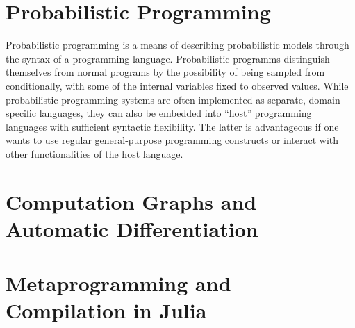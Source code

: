 \section{Probabilistic Programming}
\label{sec:prob-prog}

Probabilistic programming is a means of describing probabilistic models through the syntax of a
programming language. Probabilistic programms distinguish themselves from normal programs by the
possibility of being sampled from conditionally, with some of the internal variables fixed to
observed values.  While probabilistic programming systems are often implemented as separate,
domain-specific languages, they can also be embedded into \enquote{host} programming languages with
sufficient syntactic flexibility.  The latter is advantageous if one wants to use regular
general-purpose programming constructs or interact with other functionalities of the host language.




\section{Computation Graphs and Automatic Differentiation}
\label{sec:graph-track-autom}


\section{Metaprogramming and Compilation in Julia}
\label{sec:metapr-comp-julia}




